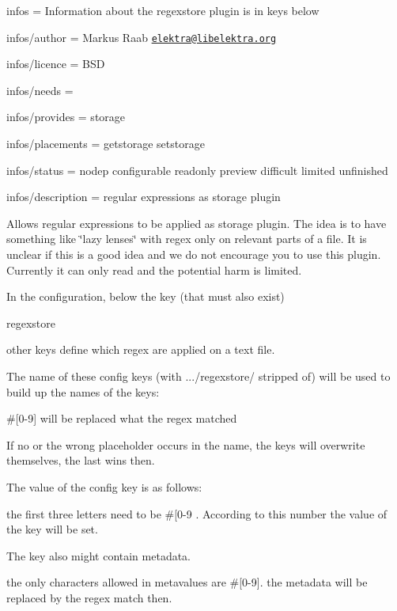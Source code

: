 
\begin{DoxyItemize}
\item infos = Information about the regexstore plugin is in keys below
\item infos/author = Markus Raab \href{mailto:elektra@libelektra.org}{\tt elektra@libelektra.\+org}
\item infos/licence = B\+SD
\item infos/needs =
\item infos/provides = storage
\item infos/placements = getstorage setstorage
\item infos/status = nodep configurable readonly preview difficult limited unfinished
\item infos/description = regular expressions as storage plugin
\end{DoxyItemize}

Allows regular expressions to be applied as storage plugin. The idea is to have something like \char`\"{}lazy lenses\char`\"{} with regex only on relevant parts of a file. It is unclear if this is a good idea and we do not encourage you to use this plugin. Currently it can only read and the potential harm is limited.

In the configuration, below the key (that must also exist) \begin{DoxyVerb}regexstore
\end{DoxyVerb}


other keys define which regex are applied on a text file.

The name of these config keys (with .../regexstore/ stripped of) will be used to build up the names of the keys\+:
\begin{DoxyItemize}
\item \#\mbox{[}0-\/9\mbox{]} will be replaced what the regex matched
\item If no or the wrong placeholder occurs in the name, the keys will overwrite themselves, the last wins then.
\end{DoxyItemize}

The value of the config key is as follows\+:
\begin{DoxyItemize}
\item the first three letters need to be \textquotesingle{}\#\mbox{[}0-\/9 \textquotesingle{}. According to this number the value of the key will be set.
\end{DoxyItemize}

The key also might contain metadata.
\begin{DoxyItemize}
\item the only characters allowed in metavalues are \textquotesingle{}\#\mbox{[}0-\/9\mbox{]}\textquotesingle{}. the metadata will be replaced by the regex match then.
\end{DoxyItemize}

